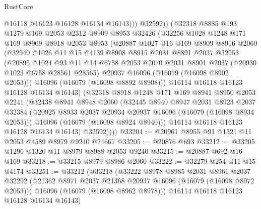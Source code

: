\begin{lexlean}{RustCore}
\begin{coremodule}
                @16118
                @16123
                @16128
                @16134
                @16143)))
          @32592))
      (@32318
        @8885
        @193
        @1279
        @169
        @2053
        @2312
        @8909
        @8953
        @32426
        (@32256
          @1028
          @1248
          @171
          @169
          @8909
          @8918
          @2053
          @8953
          (@20887
            @1027
            @16
            @169
            @8909
            @8916
            @2060
            (@32940
              @1026
              @11
              @15
              @4139
              @8908
              @8915
              @2031
              @8891
              @2037
              @32953
              (@20895
                @1024
                @93
                @11
                @14
                @6758
                @2053
                @2070
                @2031
                @8901
                @2037
                (@20930 @1023 @6758 @28561 @28565)
                @20937
                @16096
                (@16079 (@16098 @8902 @2053)))
              @16096
              (@16079 (@16098 @8892 @8908)))
            @16114
            @16118
            @16123
            @16128
            @16134
            @16143)
          (@32318
            @8918
            @1248
            @171
            @169
            @8941
            @8950
            @2053
            @2241
            (@32438
              @8941
              @8948
              @2060
              (@32445
                @8940
                @8947
                @2031
                @8923
                @2037
                @32384
                (@20925 @8933 @2037 @20934 @20937 @16096 (@16079 (@16098 @8934 @2053)))
                @16096
                (@16079 (@16098 @8924 @8940)))
              @16114
              @16118
              @16123
              @16128
              @16134
              @16143)
            @32592))))
@33204 := @20961 @8955 @91 @1321 @11 @2053 @4589 @8979 @9240 @24667
@33205 := @20876 @693
@33212 := @33205 @1296 @1320 @11 @8979 @8988 @2053 @9240
@33215 := @20887 @692 @16 @169
@33218 := @33215 @8979 @8986 @2060
@33222 := @32279 @254 @11 @15 @4174
@33251 := @33212
    (@33218
      (@33222
        @8978
        @8985
        @2031
        @8961
        @2037
        @32292
        (@21362 @8971 @2037 @21368 @20937 @16096 (@16079 (@16098 @8972 @2053)))
        @16096
        (@16079 (@16098 @8962 @8978)))
      @16114
      @16118
      @16123
      @16128
      @16134
      @16143)

\end{coremodule}
\end{lexlean}
